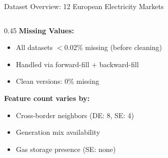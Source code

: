 \documentclass[aspectratio=169]{beamer}
\begin{document}
\begin{frame}{Dataset Overview: 12 European Electricity Markets}
\begin{columns}
\begin{column}{0.45\textwidth}
\vspace{0.2cm}
\textbf{Missing Values:}
\begin{itemize}\scriptsize
    \item All datasets $<$0.02\% missing (before cleaning)
    \item Handled via forward-fill + backward-fill
    \item Clean versions: 0\% missing
\end{itemize}

\vspace{0.2cm}
\textbf{Feature count varies by:}
\begin{itemize}\scriptsize
    \item Cross-border neighbors (DE: 8, SE: 4)
    \item Generation mix availability
    \item Gas storage presence (SE: none)
\end{itemize}
\end{column}
\end{columns}
\end{frame}
\end{document}
